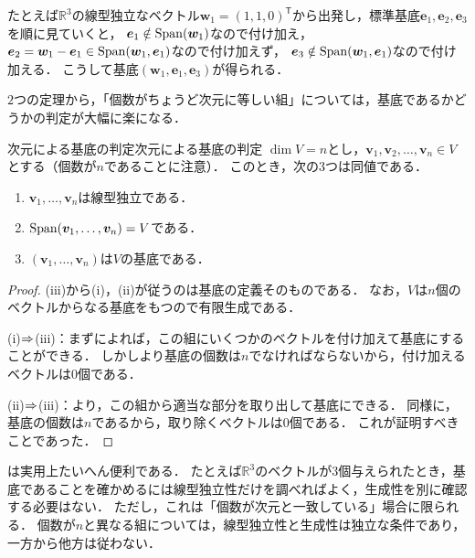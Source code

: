 たとえば$\mathbb{R}^3$の線型独立なベクトル$\bm{w}_1=(1,1,0)^\mathsf{T}$から出発し，標準基底$\bm{e}_1,\bm{e}_2,\bm{e}_3$を順に見ていくと，
$\bm{e}_1\notin\operatorname{Span}(\bm{w}_1)$なので付け加え，
$\bm{e}_2=\bm{w}_1-\bm{e}_1\in\operatorname{Span}(\bm{w}_1,\bm{e}_1)$なので付け加えず，
$\bm{e}_3\notin\operatorname{Span}(\bm{w}_1,\bm{e}_1)$なので付け加える．
こうして基底$(\bm{w}_1,\bm{e}_1,\bm{e}_3)$が得られる．

$2$つの定理から，「個数がちょうど次元に等しい組」については，基底であるかどうかの判定が大幅に楽になる．

\begin{cor}{次元による基底の判定}{次元による基底の判定}
  $\dim V = n$とし，$\bm{v}_1, \bm{v}_2, \dots, \bm{v}_n \in V$とする（個数が$n$であることに注意）．
  このとき，次の$3$つは同値である．
  \begin{enumerate}[label=(\roman*),leftmargin=3.2em]
    \item $\bm{v}_1, \dots, \bm{v}_n$は線型独立である．
    \item $\operatorname{Span}(\bm{v}_1, \dots, \bm{v}_n) = V$である．
    \item $(\bm{v}_1, \dots, \bm{v}_n)$は$V$の基底である．
  \end{enumerate}
\end{cor}

\begin{tleftbar}
\begin{proof}
  (iii)から(i)，(ii)が従うのは基底の定義そのものである．
  なお，$V$は$n$個のベクトルからなる基底をもつので有限生成である．

  (i)$\mathrel{\Rightarrow}$(iii)：まずによれば，この組にいくつかのベクトルを付け加えて基底にすることができる．
  しかしより基底の個数は$n$でなければならないから，付け加えるベクトルは$0$個である．

  (ii)$\mathrel{\Rightarrow}$(iii)：より，この組から適当な部分を取り出して基底にできる．
  同様に，基底の個数は$n$であるから，取り除くベクトルは$0$個である．
  これが証明すべきことであった．
\end{proof}
\end{tleftbar}

\begin{remark}[次元による基底の判定の注意]
  は実用上たいへん便利である．
  たとえば$\mathbb{R}^3$のベクトルが$3$個与えられたとき，基底であることを確かめるには線型独立性だけを調べればよく，生成性を別に確認する必要はない．
  ただし，これは「個数が次元と一致している」場合に限られる．
  個数が$n$と異なる組については，線型独立性と生成性は独立な条件であり，一方から他方は従わない．
\end{remark}

